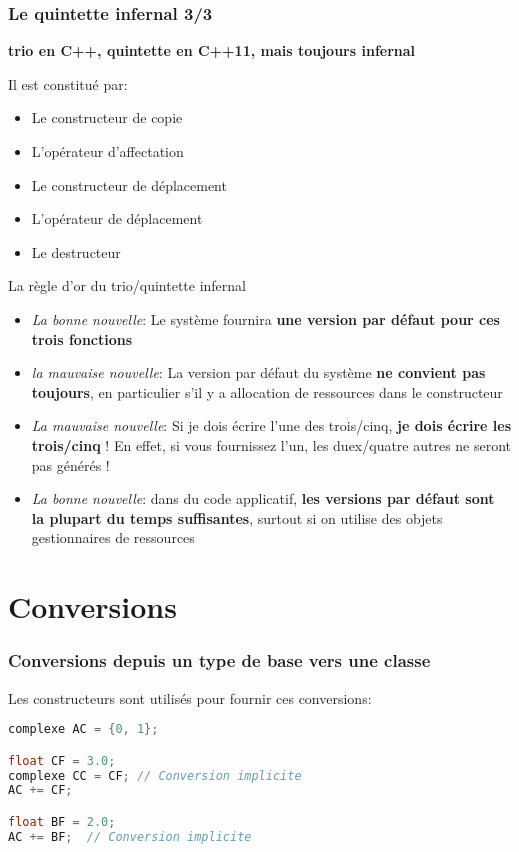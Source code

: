 \documentclass{beamer}
\begin{document}
\begin{frame}[fragile=singleslide,shrink=20]
\frametitle {Le quintette infernal 3/3}

\textbf{trio en C++, quintette en C++11, mais toujours infernal}

Il est constitué par:
\begin{itemize}
\item{Le constructeur de copie}
\item{L'opérateur d'affectation}
\item{Le constructeur de déplacement}
\item{L'opérateur de déplacement}
\item{Le destructeur}
\end{itemize}

\begin{block}{La règle d'or du trio/quintette infernal}
\begin{itemize}
\item{\textit{La bonne nouvelle}: Le système fournira \textbf{une version par défaut pour ces trois fonctions} }
\item{\textit{la mauvaise nouvelle}: La version par défaut du système \textbf{ne convient pas toujours}, en particulier s'il y a allocation de ressources dans le constructeur}
\item{\textit{La mauvaise nouvelle}: Si je dois écrire l'une des trois/cinq, \textbf{je dois écrire les trois/cinq} ! En effet, si vous fournissez l'un, les duex/quatre autres ne seront pas générés !}
\item{\textit{La bonne nouvelle}: dans du code applicatif, \textbf{les versions par défaut sont la plupart du temps suffisantes}, surtout si on utilise des objets gestionnaires de ressources}
\end{itemize}
\end{block}
\end{frame}

\section{Conversions}
\begin{frame}[fragile=singleslide,shrink=20]
\frametitle {Conversions depuis un type de base vers une classe}

Les constructeurs sont utilisés pour fournir ces conversions:
\begin{lstlisting}[language=c++]
complexe AC = {0, 1};

float CF = 3.0;
complexe CC = CF; // Conversion implicite
AC += CF;

float BF = 2.0;
AC += BF;  // Conversion implicite
\end{lstlisting}
\end{frame}
\end{document}
